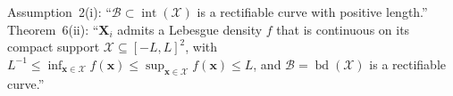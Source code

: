 Assumption~2(i): ``\(\mathcal B\subset\operatorname{int}(\mathcal X)\) is a rectifiable curve with positive length.''  Theorem~6(ii): ``\(\mathbf X_i\) admits a Lebesgue density \(f\) that is continuous on its compact support \(\mathcal X\subseteq[-L,L]^2\), with \(L^{-1}\leq\inf_{\mathbf x\in\mathcal X}f(\mathbf x)\leq\sup_{\mathbf x\in\mathcal X}f(\mathbf x)\leq L\), and \(\mathcal B=\operatorname{bd}(\mathcal X)\) is a rectifiable curve.''